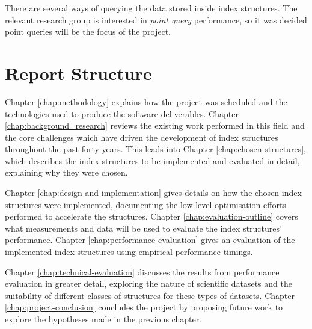 There are several ways of querying the data stored inside index structures. The relevant research group is interested in \textit{point query} performance, so it was decided point queries will be the focus of the project.

\section{Report Structure}

Chapter \ref{chap:methodology} explains how the project was scheduled and the technologies used to produce the software deliverables. Chapter \ref{chap:background_research} reviews the existing work performed in this field and the core challenges which have driven the development of index structures throughout the past forty years. This leads into Chapter \ref{chap:chosen-structures}, which describes the index structures to be implemented and evaluated in detail, explaining why they were chosen.

Chapter \ref{chap:design-and-implementation} gives details on how the chosen index structures were implemented, documenting the low-level optimisation efforts performed to accelerate the structures. Chapter \ref{chap:evaluation-outline} covers what measurements and data will be used to evaluate the index structures' performance. Chapter \ref{chap:performance-evaluation} gives an evaluation of the implemented index structures using empirical performance timings. 

Chapter \ref{chap:technical-evaluation} discusses the results from performance evaluation in greater detail, exploring the nature of scientific datasets and the suitability of different classes of structures for these types of datasets. Chapter \ref{chap:project-conclusion} concludes the project by proposing future work to explore the hypotheses made in the previous chapter.